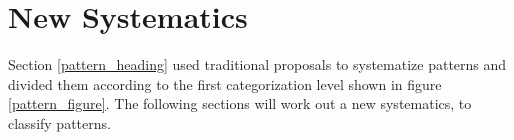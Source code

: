 %
%
%
%
%
%
%

\section{New Systematics}
\label{new_systematics_heading}

Section \ref{pattern_heading} used traditional proposals \cite{buschmann,gamma1995}
to systematize patterns and divided them according to the first categorization
level shown in figure \ref{pattern_figure}. The following sections will work out
a new systematics, to classify patterns.




